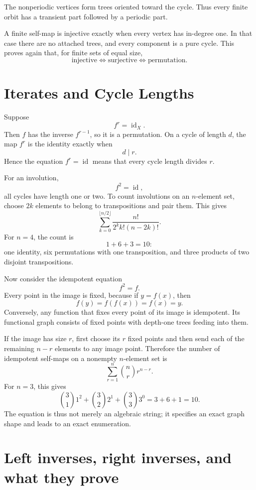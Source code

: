 The nonperiodic vertices form trees oriented toward the cycle.  Thus every finite orbit has a transient part followed by a periodic part.

A finite self-map is injective exactly when every vertex has in-degree one.  In that case there are no attached trees, and every component is a pure cycle.  This proves again that, for finite sets of equal size,
\[
  \text{injective}
  \Longleftrightarrow
  \text{surjective}
  \Longleftrightarrow
  \text{permutation}.
\]

\section{Iterates and Cycle Lengths}

Suppose
\[
  f^r=\operatorname{id}_X.
\]
Then \(f\) has the inverse \(f^{r-1}\), so it is a permutation.  On a cycle of length \(d\), the map \(f^r\) is the identity exactly when
\[
  d\mid r.
\]
Hence the equation \(f^r=\operatorname{id}\) means that every cycle length divides \(r\).

For an involution,
\[
  f^2=\operatorname{id},
\]
all cycles have length one or two.  To count involutions on an \(n\)-element set, choose \(2k\) elements to belong to transpositions and pair them.  This gives
\[
  \boxed{
  \sum_{k=0}^{\lfloor n/2\rfloor}
  \frac{n!}{2^k k!(n-2k)!}.}
\]
For \(n=4\), the count is
\[
  1+6+3=10:
\]
one identity, six permutations with one transposition, and three products of two disjoint transpositions.

Now consider the idempotent equation
\[
  f^2=f.
\]
Every point in the image is fixed, because if \(y=f(x)\), then
\[
  f(y)=f(f(x))=f(x)=y.
\]
Conversely, any function that fixes every point of its image is idempotent.  Its functional graph consists of fixed points with depth-one trees feeding into them.

If the image has size \(r\), first choose its \(r\) fixed points and then send each of the remaining \(n-r\) elements to any image point.  Therefore the number of idempotent self-maps on a nonempty \(n\)-element set is
\[
  \boxed{
  \sum_{r=1}^{n}\binom{n}{r}r^{n-r}.}
\]
For \(n=3\), this gives
\[
  \binom31 1^2+\binom32 2^1+\binom33 3^0
  =3+6+1=10.
\]
The equation is thus not merely an algebraic string; it specifies an exact graph shape and leads to an exact enumeration.

\section{Left inverses, right inverses, and what they prove}

